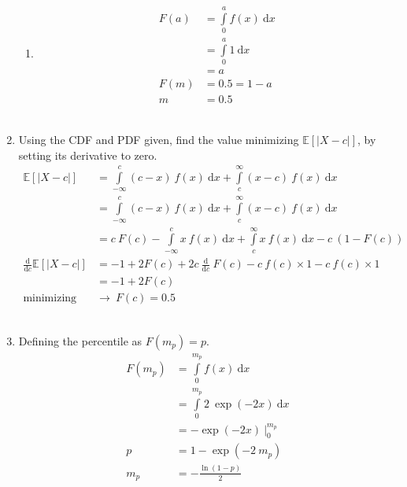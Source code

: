 \begin{enumerate}
\begin{enumerate}
			\item 	\begin{align}
				F(a) &= \int\limits_{0}^{a} f(x)\ \mathrm{d}x \nonumber \\
				&= \int\limits_{0}^{a} 1\ \mathrm{d}x \nonumber \\
				&= a \nonumber \\
				F(m) &= 0.5 = 1 - a \nonumber \\
				m &= 0.5
			\end{align} \\
			
		\end{enumerate}
	
	
	
	\item Using the CDF and PDF given, find the value minimizing $ \mathbb{E}[\left|X - c\right|] $, by setting its derivative to zero. \\
	
		\begin{align}
			\mathbb{E}[\left|X - c\right|] &= \int\limits_{-\infty}^{c} (c - x)\ f(x)\ \mathrm{d}x + \int\limits_{c}^{\infty} (x - c)\ f(x)\ \mathrm{d}x \nonumber \\
			&= \int\limits_{-\infty}^{c} (c - x)\ f(x)\ \mathrm{d}x + \int\limits_{c}^{\infty} (x - c)\ f(x)\ \mathrm{d}x \nonumber \\
			&= c\ F(c) - \int\limits_{-\infty}^{c} x\ f(x)\ \mathrm{d}x + \int\limits_{c}^{\infty} x\ f(x)\ \mathrm{d}x - c\ (1 - F(c)) \nonumber \\
			\frac{\mathrm{d}}{\mathrm{d} c} \mathbb{E}[\left|X - c\right|] &= -1 + 2F(c) + 2c\  \frac{\mathrm{d}}{\mathrm{d} c}\ F(c) - c\ f(c) \times 1 - c\ f(c) \times 1 \nonumber \\
			&= -1 + 2F(c) \nonumber \\
			\text{minimizing}\ &\to\ F(c) = 0.5
		\end{align} \\
	
	
	\item Defining the percentile as $ F(m_p) = p $. \\
	
		\begin{align}
			F(m_p) &= \int\limits_{0}^{m_p} f(x)\ \mathrm{d}x \nonumber \\
			&= \int\limits_{0}^{m_p} 2\ \exp(-2x)\ \mathrm{d}x \nonumber \\
			&= -\exp(-2x)\ \Big|_{0}^{m_p} \\
			p &= 1 - \exp(-2\ m_p) \nonumber \\
			m_p &= - \frac{\ln(1 - p)}{2}
		\end{align} \\
	

\end{enumerate}

